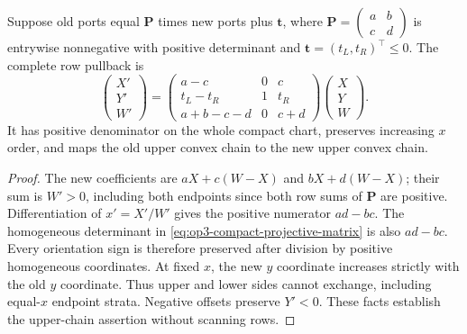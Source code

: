 \begin{lemma}
\label{lem:op3-compact-projective-pullback}
Suppose old ports equal $\boldsymbol P$ times new ports plus
$\boldsymbol t$, where
$\boldsymbol P=\left(\begin{smallmatrix}a&b\\c&d\end{smallmatrix}\right)$
is entrywise nonnegative with positive determinant and
$\boldsymbol t=(t_L,t_R)^\top\leq0$.
The complete row pullback is
\begin{equation}
 \begin{pmatrix}X'\\Y'\\W'\end{pmatrix}=
 \begin{pmatrix}
 a-c&0&c\\ t_L-t_R&1&t_R\\a+b-c-d&0&c+d
 \end{pmatrix}
 \begin{pmatrix}X\\Y\\W\end{pmatrix}.
 \label{eq:op3-compact-projective-matrix}
\end{equation}
It has positive denominator on the whole compact chart, preserves increasing
$x$ order, and maps the old upper convex chain to the new upper convex chain.
\end{lemma}
\begin{proof}
The new coefficients are $aX+c(W-X)$ and $bX+d(W-X)$; their sum is
$W'>0$, including both endpoints since both row sums of $\boldsymbol P$
are positive. Differentiation of $x'=X'/W'$ gives the positive numerator
$ad-bc$. The homogeneous determinant in
\eqref{eq:op3-compact-projective-matrix} is also $ad-bc$.
Every orientation sign is therefore preserved after division by positive
homogeneous coordinates. At fixed $x$, the new $y$ coordinate increases
strictly with the old $y$ coordinate. Thus upper and lower sides cannot
exchange, including equal-$x$ endpoint strata. Negative offsets preserve
$Y'<0$. These facts establish the upper-chain assertion without scanning rows.
\end{proof}

